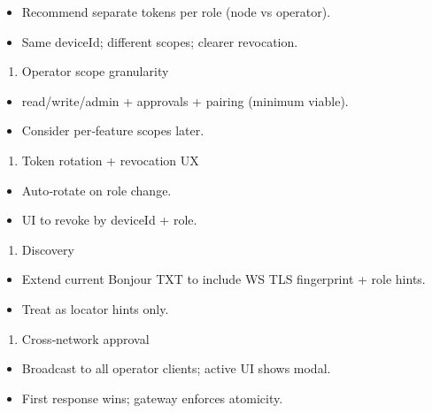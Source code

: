 \begin{itemize}
  \item Recommend separate tokens per role (node vs operator).
  \item Same deviceId; different scopes; clearer revocation.
\end{itemize}


\begin{enumerate}
  \item Operator scope granularity
\end{enumerate}

\begin{itemize}
  \item read/write/admin + approvals + pairing (minimum viable).
  \item Consider per‑feature scopes later.
\end{itemize}


\begin{enumerate}
  \item Token rotation + revocation UX
\end{enumerate}

\begin{itemize}
  \item Auto‑rotate on role change.
  \item UI to revoke by deviceId + role.
\end{itemize}


\begin{enumerate}
  \item Discovery
\end{enumerate}

\begin{itemize}
  \item Extend current Bonjour TXT to include WS TLS fingerprint + role hints.
  \item Treat as locator hints only.
\end{itemize}


\begin{enumerate}
  \item Cross‑network approval
\end{enumerate}

\begin{itemize}
  \item Broadcast to all operator clients; active UI shows modal.
  \item First response wins; gateway enforces atomicity.
\end{itemize}


